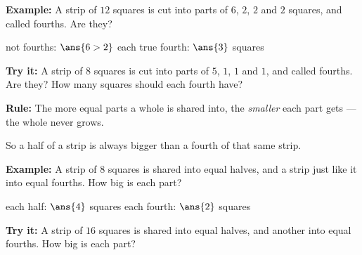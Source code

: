 \documentclass[12pt]{article}
\begin{document}
\begin{examplebox}
\textbf{Example:} \quad A strip of $12$ squares is cut into parts of $6$, $2$, $2$ and $2$ squares, and called fourths. Are they?

not fourths: $\ans{6 > 2}$ \qquad each true fourth: $\ans{3}$ squares
\end{examplebox}

\begin{tryitbox}
\textbf{Try it:} \quad A strip of $8$ squares is cut into parts of $5$, $1$, $1$ and $1$, and called fourths. Are they? How many squares should each fourth have?\\[2pt]
\end{tryitbox}


\begin{formulabox}
\textbf{Rule:} The more equal parts a whole is shared into, the \emph{smaller} each part gets --- the whole never grows.\par
So a half of a strip is always bigger than a fourth of that same strip.
\end{formulabox}

\begin{examplebox}
\textbf{Example:} \quad A strip of $8$ squares is shared into equal halves, and a strip just like it into equal fourths. How big is each part?

each half: $\ans{4}$ squares \qquad each fourth: $\ans{2}$ squares
\end{examplebox}

\begin{tryitbox}
\textbf{Try it:} \quad A strip of $16$ squares is shared into equal halves, and another into equal fourths. How big is each part?\\[2pt]
\end{tryitbox}
\end{document}
